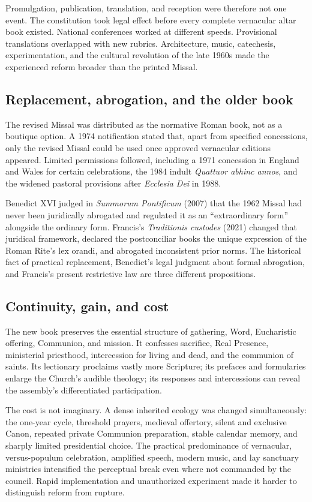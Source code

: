 Promulgation, publication, translation, and reception were therefore not one event. The constitution took legal effect before every complete vernacular altar book existed. National conferences worked at different speeds. Provisional translations overlapped with new rubrics. Architecture, music, catechesis, experimentation, and the cultural revolution of the late 1960s made the experienced reform broader than the printed Missal.

\subsection{Replacement, abrogation, and the older book}

The revised Missal was distributed as the normative Roman book, not as a boutique option. A 1974 notification stated that, apart from specified concessions, only the revised Missal could be used once approved vernacular editions appeared. Limited permissions followed, including a 1971 concession in England and Wales for certain celebrations, the 1984 indult \emph{Quattuor abhinc annos}, and the widened pastoral provisions after \emph{Ecclesia Dei} in 1988.

Benedict XVI judged in \emph{Summorum Pontificum} (2007) that the 1962 Missal had never been juridically abrogated and regulated it as an “extraordinary form” alongside the ordinary form. Francis's \emph{Traditionis custodes} (2021) changed that juridical framework, declared the postconciliar books the unique expression of the Roman Rite's lex orandi, and abrogated inconsistent prior norms. The historical fact of practical replacement, Benedict's legal judgment about formal abrogation, and Francis's present restrictive law are three different propositions.

\subsection{Continuity, gain, and cost}

The new book preserves the essential structure of gathering, Word, Eucharistic offering, Communion, and mission. It confesses sacrifice, Real Presence, ministerial priesthood, intercession for living and dead, and the communion of saints. Its lectionary proclaims vastly more Scripture; its prefaces and formularies enlarge the Church's audible theology; its responses and intercessions can reveal the assembly's differentiated participation.

The cost is not imaginary. A dense inherited ecology was changed simultaneously: the one-year cycle, threshold prayers, medieval offertory, silent and exclusive Canon, repeated private Communion preparation, stable calendar memory, and sharply limited presidential choice. The practical predominance of vernacular, versus-populum celebration, amplified speech, modern music, and lay sanctuary ministries intensified the perceptual break even where not commanded by the council. Rapid implementation and unauthorized experiment made it harder to distinguish reform from rupture.

